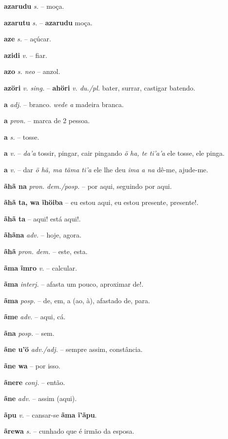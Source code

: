 \textbf{azarudu} \textit{s.} -- moça.

\textbf{azarutu} \textit{s.} -- \textbf{azarudu} moça.

\textbf{aze} \textit{s.} -- açúcar.

\textbf{azidi} \textit{v.} -- fiar.

\textbf{azo} \textit{s. neo} -- anzol.

\textbf{azöri} \textit{v. sing.} -- \textbf{ahöri} \textit{v. du./pl.} bater, surrar, castigar batendo.

\textbf{a} \textit{adj.} -- branco.  \textit{wede a} madeira branca.

\textbf{a} \textit{pron.} -- marca de 2 pessoa.

\textbf{a} \textit{s.} -- tosse.

\textbf{a} \textit{v.} -- \textit{da'a} tossir, pingar, cair pingando  \textit{ö ha, te ti'a'a} ele tosse, ele pinga.

\textbf{a} \textit{v.} -- dar  \textit{ö hã, ma tãma ti'a} ele lhe deu  \textit{ima a na} dê-me, ajude-me.

\textbf{ãhã na} \textit{pron. dem./posp.} -- por aqui, seguindo por aqui.

\textbf{ãhã ta, wa ĩhöiba} -- eu estou aqui, eu estou presente, presente!.

\textbf{ãhã ta} -- aqui! está aqui!.

\textbf{ãhãna} \textit{adv.} -- hoje, agora.

\textbf{ãhã} \textit{pron. dem.} -- este, esta.

\textbf{ãma ĩmro} \textit{v.} -- calcular.

\textbf{ãma} \textit{interj.} -- afasta um pouco, aproximar de!.

\textbf{ãma} \textit{posp.} -- de, em, a (ao, à), afastado de, para.

\textbf{ãme} \textit{adv.} -- aqui, cá.

\textbf{ãna} \textit{posp.} -- sem.

\textbf{ãne u'ö} \textit{adv./adj.} -- sempre assim, constância.

\textbf{ãne wa} -- por isso.

\textbf{ãnere} \textit{conj.} -- então.

\textbf{ãne} \textit{adv.} -- assim (aqui).

\textbf{ãpu} \textit{v.} -- cansar-se  \textbf{ãma ĩ'ãpu}.

\textbf{ãrewa} \textit{s.} -- cunhado que é irmão da esposa.

